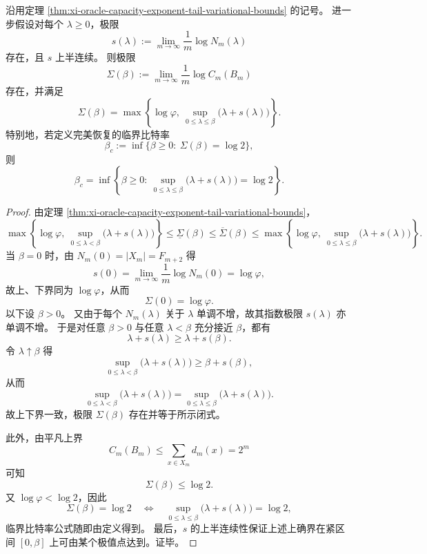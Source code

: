 \begin{corollary}\label{cor:xi-oracle-capacity-exponent-closed-form-tail-spectrum}
沿用定理 \ref{thm:xi-oracle-capacity-exponent-tail-variational-bounds} 的记号。
进一步假设对每个 \(\lambda\ge 0\)，极限
\[
s(\lambda):=\lim_{m\to\infty}\frac1m\log N_m(\lambda)
\]
存在，且 \(s\) 上半连续。
则极限
\[
\Sigma(\beta):=\lim_{m\to\infty}\frac1m\log C_m(B_m)
\]
存在，并满足
\[
\boxed{\;
\Sigma(\beta)=
\max\!\left\{\log\varphi,\ \sup_{0\le \lambda\le \beta}\bigl(\lambda+s(\lambda)\bigr)\right\}. \;}
\]
特别地，若定义完美恢复的临界比特率
\[
\beta_c:=\inf\{\beta\ge 0:\ \Sigma(\beta)=\log 2\},
\]
则
\[
\boxed{\;
\beta_c=
\inf\!\left\{
\beta\ge 0:\ 
\sup_{0\le \lambda\le \beta}\bigl(\lambda+s(\lambda)\bigr)=\log 2
\right\}. \;}
\]
\end{corollary}
\begin{proof}
由定理 \ref{thm:xi-oracle-capacity-exponent-tail-variational-bounds}，
\[
\max\!\left\{\log\varphi,\ \sup_{0\le \lambda<\beta}\bigl(\lambda+s(\lambda)\bigr)\right\}
\le
\underline\Sigma(\beta)
\le
\overline\Sigma(\beta)
\le
\max\!\left\{\log\varphi,\ \sup_{0\le \lambda\le \beta}\bigl(\lambda+s(\lambda)\bigr)\right\}.
\]
当 \(\beta=0\) 时，由 \(N_m(0)=|X_m|=F_{m+2}\) 得
\[
s(0)=\lim_{m\to\infty}\frac1m\log N_m(0)=\log\varphi,
\]
故上、下界同为 \(\log\varphi\)，从而
\[
\Sigma(0)=\log\varphi.
\]
以下设 \(\beta>0\)。
又由于每个 \(N_m(\lambda)\) 关于 \(\lambda\) 单调不增，故其指数极限 \(s(\lambda)\) 亦单调不增。
于是对任意 \(\beta>0\) 与任意 \(\lambda<\beta\) 充分接近 \(\beta\)，都有
\[
\lambda+s(\lambda)\ge \lambda+s(\beta).
\]
令 \(\lambda\uparrow \beta\) 得
\[
\sup_{0\le \lambda<\beta}\bigl(\lambda+s(\lambda)\bigr)\ge \beta+s(\beta),
\]
从而
\[
\sup_{0\le \lambda<\beta}\bigl(\lambda+s(\lambda)\bigr)
=
\sup_{0\le \lambda\le \beta}\bigl(\lambda+s(\lambda)\bigr).
\]
故上下界一致，极限 \(\Sigma(\beta)\) 存在并等于所示闭式。
\par
此外，由平凡上界
\[
C_m(B_m)\le \sum_{x\in X_m}d_m(x)=2^m
\]
可知
\[
\Sigma(\beta)\le \log 2.
\]
又 \(\log\varphi<\log 2\)，因此
\[
\Sigma(\beta)=\log 2
\quad\Longleftrightarrow\quad
\sup_{0\le \lambda\le \beta}\bigl(\lambda+s(\lambda)\bigr)=\log 2,
\]
临界比特率公式随即由定义得到。
最后，\(s\) 的上半连续性保证上述上确界在紧区间 \([0,\beta]\) 上可由某个极值点达到。证毕。
\end{proof}

\endinput


